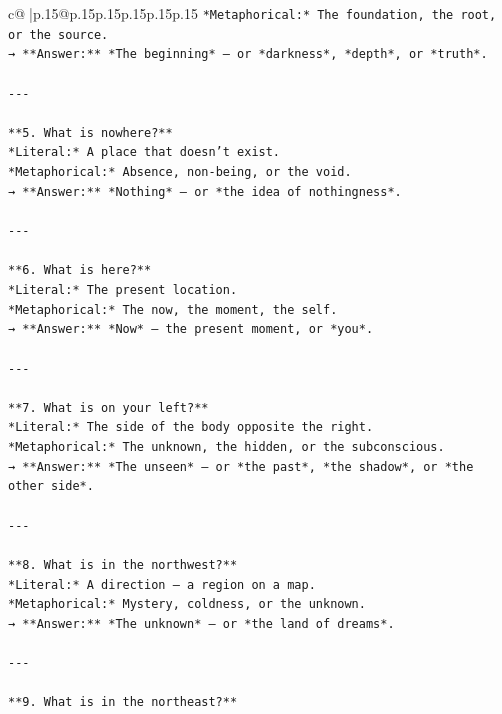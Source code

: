 \documentclass{article}
\begin{document}
{\begin{supertabular}{c@{$\;$}|p{.15\linewidth}@{}p{.15\linewidth}p{.15\linewidth}p{.15\linewidth}p{.15\linewidth}p{.15\linewidth}}
{{{\texttt{*Metaphorical:* The foundation, the root, or the source.  } \\
\texttt{→ **Answer:** *The beginning* — or *darkness*, *depth*, or *truth*.} \\
\\ 
\texttt{{-}{-}{-}} \\
\\ 
\texttt{**5. What is nowhere?**  } \\
\texttt{*Literal:* A place that doesn’t exist.  } \\
\texttt{*Metaphorical:* Absence, non{-}being, or the void.  } \\
\texttt{→ **Answer:** *Nothing* — or *the idea of nothingness*.} \\
\\ 
\texttt{{-}{-}{-}} \\
\\ 
\texttt{**6. What is here?**  } \\
\texttt{*Literal:* The present location.  } \\
\texttt{*Metaphorical:* The now, the moment, the self.  } \\
\texttt{→ **Answer:** *Now* — the present moment, or *you*.} \\
\\ 
\texttt{{-}{-}{-}} \\
\\ 
\texttt{**7. What is on your left?**  } \\
\texttt{*Literal:* The side of the body opposite the right.  } \\
\texttt{*Metaphorical:* The unknown, the hidden, or the subconscious.  } \\
\texttt{→ **Answer:** *The unseen* — or *the past*, *the shadow*, or *the other side*.} \\
\\ 
\texttt{{-}{-}{-}} \\
\\ 
\texttt{**8. What is in the northwest?**  } \\
\texttt{*Literal:* A direction — a region on a map.  } \\
\texttt{*Metaphorical:* Mystery, coldness, or the unknown.  } \\
\texttt{→ **Answer:** *The unknown* — or *the land of dreams*.} \\
\\ 
\texttt{{-}{-}{-}} \\
\\ 
\texttt{**9. What is in the northeast?**  } \\
}}}
\end{supertabular}}
\end{document}
